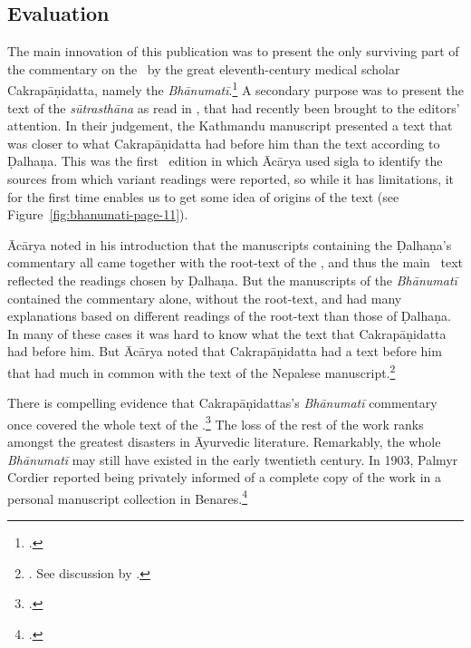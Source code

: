 \subsection{Evaluation}

The main innovation of this publication was to present the only surviving part of
the commentary on the \SS\ by the great eleventh-century medical scholar
Cakrapāṇidatta, namely the \emph{Bhānumatī}.\footcite[IA, 374--375 and IB,
495--496]{meul-hist} A secondary purpose was to present the text of the
\emph{sūtrasthāna} as read in , that had recently been
brought to the editors' attention. In their judgement, the Kathmandu manuscript
presented a text that was closer to what Cakrapāṇidatta had before him than the
text according to Ḍalhaṇa.   This was the first \SS\ edition in which Ācārya used
sigla to identify the sources from which variant readings were reported, so while
it has limitations, it for the first time enables us to get some idea of origins
of the text (see Figure~\ref{fig:bhanumati-page-11}).

Ācārya noted in his introduction that the manuscripts containing the Ḍalhaṇa's
commentary all came together with the root-text of the \SS, and thus the main \SS\
text reflected the readings chosen by Ḍalhaṇa.  But the manuscripts of the
\emph{Bhānumatī} contained the commentary alone, without the root-text, and had
many explanations based on different readings of the root-text than those of
Ḍalhaṇa.  In many of these cases it was hard to know what the text that
Cakrapāṇidatta had before him. But Ācārya noted that Cakrapāṇidatta had a text
before him that had much in common with the text of the Nepalese
manuscript.\footnote{\cite[3--4]{acar-1939}.  See discussion by
\citet[7]{kleb-2021a}.}  

There is compelling evidence that Cakrapāṇidattas's \emph{Bhānumatī} commentary
once covered the whole text of the \SS.\footcite[IA, 375]{meul-hist}  The loss of
the rest of the work ranks amongst the greatest disasters in Āyurvedic
literature.  Remarkably, the whole \emph{Bhānumatī} may still have existed in the
early twentieth century. In 1903, Palmyr Cordier reported being privately informed
of a complete copy of the work in a personal manuscript collection in
Benares.\footcite[332]{cord-1903}

